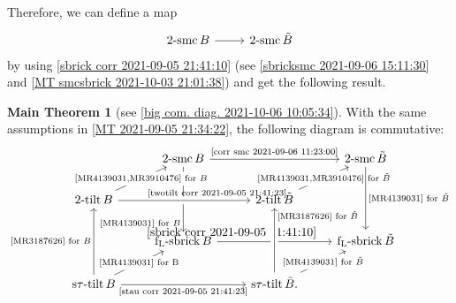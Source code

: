 \documentclass[pdftex,a4paper]{article}
\numberwithin{equation}{subsection}
\theoremstyle{definition}
\newtheorem{maintheorem}[theorem]{Main Theorem}
\newcommand{\twotilt}{\operatorname{\mathrm{2-tilt}}}
\newcommand{\stautilt}{\operatorname{\mathrm{s\tau-tilt}}}
\newcommand{\flsbrick}{\operatorname{\mathrm{f_L-sbrick}}}
\newcommand{\twosmc}{\operatorname{\mathrm{2-smc}}}
\begin{document}
Therefore, we can define a map
\begin{equation}\label{corr smc 2021-09-06 11:23:00}
	\begin{tikzcd}[ampersand replacement=\&,row sep=1pt]
		\twosmc B \ar[r]\&\twosmc \tilde{B}
	\end{tikzcd}
\end{equation}
by using \eqref{sbrick corr 2021-09-05 21:41:10} (see \cref{sbricksmc 2021-09-06 15:11:30} and \cref{MT smcsbrick 2021-10-03 21:01:38}) and get the following result.
\begin{maintheorem}[{see \cref{big com. diag. 2021-10-06 10:05:34}}]
	With the same assumptions in \cref{MT 2021-09-05 21:34:22}, the following diagram is commutative:
	\begin{equation}
		\begin{tikzcd}
			&\twosmc B\ar[dd,"\text{\cite{MR4139031} for \(B\)}"'very near end]  \ar[rr,"\text{\eqref{corr smc 2021-09-06 11:23:00}}"]&&\twosmc \tilde{B}\\
			\twotilt B\ar[ru,"\text{\cite{MR4139031,MR3910476} for \(B\)}"description] \ar[rr,"\text{\eqref{twotilt corr 2021-09-05 21:41:23}}"near end,crossing over]&&\twotilt \tilde{B}\ar[ru,"\text{\cite{MR4139031,MR3910476} for \(\tilde{B}\)}"description] \\
			&\flsbrick B\ar[rr,"\eqref{sbrick corr 2021-09-05 21:41:10}"very near start]&&\flsbrick \tilde{B}\ar[uu,leftarrow,"\text{\cite{MR4139031} for \(\tilde{B}\)}"']\\
			\stautilt B\ar[ru,"\text{\cite{MR4139031} for B}"description] \ar[uu,"\text{\cite{MR3187626} for \(B\)}"] \ar[rr,"\text{\eqref{stau corr 2021-09-05 21:41:23}}"'] &&\stautilt \tilde{B} \ar[ru,"\text{\cite{MR4139031} for \(\tilde{B}\)}"description] \ar[uu,"\text{\cite{MR3187626} for \(\tilde{B}\)}"'very near end,crossing over].
		\end{tikzcd}
	\end{equation}
\end{maintheorem}
\end{document}
